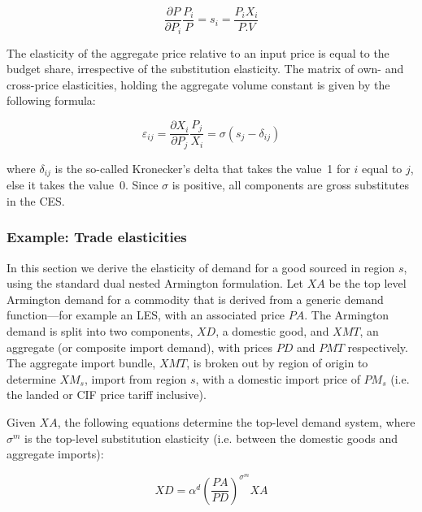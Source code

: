 \begin{displaymath}
\frac{\partial P}{\partial
{{P}_{i}}}\frac{{{P}_{i}}}{P}={{s}_{i}}=\frac{{{P}_{i}}{{X}_{i}}}{P.V}
\end{displaymath}

The elasticity of the aggregate price relative to an input price is equal to the budget share,
irrespective of the substitution elasticity. The matrix of own- and cross-price elasticities,
holding the aggregate volume constant is given by the following formula:

\begin{displaymath}
{{\varepsilon }_{ij}}=\frac{\partial {{X}_{i}}}{\partial
{{P}_{j}}}\frac{{{P}_{j}}}{{{X}_{i}}}=\sigma ({{s}_{j}}-{{\delta }_{ij}})
\end{displaymath}

\noindent where $\delta_{ij}$ is the so-called Kronecker's delta that takes the value~1 for $i$
equal to $j$, else it takes the value~0. Since $\sigma$ is positive, all components are gross
substitutes in the CES.

\subsubsection{Example: Trade elasticities}

In this section we derive the elasticity of demand for a good sourced in region $s$, using
the standard dual nested Armington formulation. Let $\mathit{XA}$ be the top level Armington demand for a commodity
that is derived from a generic demand function---for example an LES, with an associated price $\mathit{PA}$.
The Armington demand is split into two components, $\mathit{XD}$, a domestic good, and $\mathit{XMT}$, an aggregate (or composite import demand),
with prices $\mathit{PD}$ and $\mathit{PMT}$ respectively. The aggregate import bundle, $\mathit{XMT}$,
is broken out by region of origin to determine $\mathit{XM}_s$, import from region $s$,
with a domestic import price of $\mathit{PM}_s$ (i.e. the landed or CIF price tariff inclusive).

Given $\mathit{XA}$, the following equations determine the top-level demand system,
where $\sigma^m$ is the top-level substitution elasticity (i.e. between the domestic goods and aggregate imports):

\begin{equation}
\label{eq:xdces}
\mathit{XD} = \alpha^d \left(\frac{\mathit{PA}}{\mathit{PD}}\right)^{\sigma^m}\mathit{XA}
\end{equation}

